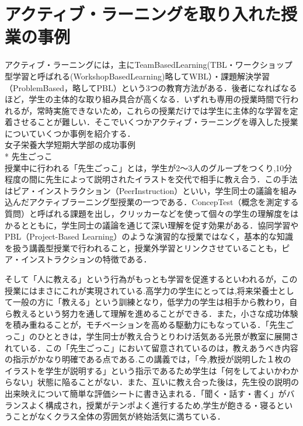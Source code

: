 \newpage

\section{アクティブ・ラーニングを取り入れた授業の事例}

アクティブ・ラーニングには，主にTeamBasedLearning(TBL・ワークショップ型学習と呼ばれる(WorkshopBasedLearning)略してWBL）・課題解決学習（ProblemBased，略してPBL）という3つの教育方法がある．後者になればなるほど，学生の主体的な取り組み具合が高くなる．いずれも専用の授業時間で行われるが，常時実施できないため，これらの授業だけでは学生に主体的な学習を定着させることが難しい．そこでいくつかアクティブ・ラーニングを導入した授業についていくつか事例を紹介する\cite{事例}．\\

女子栄養大学短期大学部の成功事例\vspace{0.2in} \\*
先生ごっこ\\
授業中に行われる「先生ごっこ」とは，学生が2～3人のグループをつくり,10分程度の間に先生によって説明されたイラストを交代で相手に教え合う．この手法はピア・インストラクション（PeerInstruction）といい，学生同士の議論を組み込んだアクティブラーニング型授業の一つである．ConcepTest（概念を測定する質問）と呼ばれる課題を出し，クリッカーなどを使って個々の学生の理解度をはかるとともに，学生同士の議論を通じて深い理解を促す効果がある．協同学習やPBL（Project-Based Learning）のような演習的な授業ではなく，基本的な知識を扱う講義型授業で行われること，授業外学習とリンクさせていることも，ピア・インストラクションの特徴である．

そして「人に教える」という行為がもっとも学習を促進するといわれるが，この授業にはまさにこれが実現されている.高学力の学生にとっては,将来栄養士として一般の方に「教える」という訓練となり，低学力の学生は相手から教わり，自ら教えるという努力を通して理解を進めることができる．また，小さな成功体験を積み重ねることが，モチベーションを高める駆動力にもなっている．「先生ごっこ」のひとときは，学生同士が教え合うとりわけ活気ある光景が教室に展開されている．この「先生ごっこ」において留意されているのは，教えあうべき内容の指示がかなり明確である点である.この講義では，「今,教授が説明した１枚のイラストを学生が説明する」という指示であるため学生は「何をしてよいかわからない」状態に陥ることがない．また、互いに教え合った後は，先生役の説明の出来映えについて簡単な評価シートに書き込まれる．「聞く・話す・書く」がバランスよく構成され，授業がテンポよく進行するため,学生が飽きる・寝るということがなくクラス全体の雰囲気が終始活気に満ちている．

